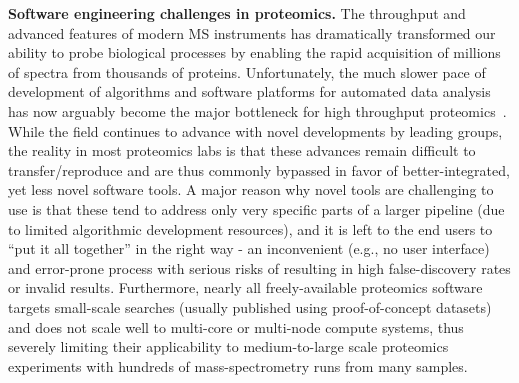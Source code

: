 \documentclass[arial,11pt]{article}
\begin{document}
{\bf Software engineering challenges in proteomics.}
The throughput and advanced features of modern MS instruments has dramatically transformed our ability to probe biological processes by enabling the rapid acquisition of millions of spectra from thousands of proteins. Unfortunately, the much slower pace of development of algorithms and software platforms for automated data analysis has now arguably become the major bottleneck for high throughput proteomics~\cite{Bell:2009,Duncan:2010}. While the field continues to advance with novel developments by leading groups, the reality in most proteomics  labs is that these advances remain difficult to transfer/reproduce and are thus commonly bypassed in favor of better-integrated, yet less novel software tools. A major reason why novel tools are challenging to use is that these tend to address only very specific parts of a larger pipeline (due to limited algorithmic development resources), and it is left to the end users to ``put it all together'' in the right way - an inconvenient (e.g., no user interface) and error-prone process with serious risks of resulting in high false-discovery rates or invalid results. Furthermore, nearly all freely-available proteomics software targets small-scale searches (usually published using proof-of-concept datasets) and does not scale well to multi-core or multi-node compute systems, thus severely limiting their applicability to medium-to-large scale proteomics experiments with hundreds of mass-spectrometry runs from many samples.
\end{document}
